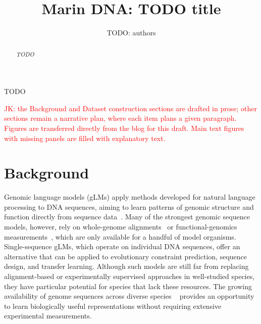 \documentclass[a4paper,num-refs]{oup-contemporary}
\title{Marin DNA: TODO title}
\author[1]{TODO: authors}
\affil[1]{TODO: affiliations}
\newcommand{\todo}{\par\noindent\textit{TODO}\par}
\begin{document}
\begin{frontmatter}
\maketitle
\begin{abstract}
\todo
\end{abstract}
\begin{keywords}
TODO
\end{keywords}
\end{frontmatter}

\textcolor{red}{JK: the Background and Dataset construction sections are drafted in prose;
other sections remain a narrative plan, where each item plans a given paragraph.
Figures are transferred directly from the blog for this draft.
Main text figures with missing panels are filled with explanatory text.}


\section{Background}

Genomic language models (gLMs) apply methods developed for natural language
processing to DNA sequences, aiming to learn patterns of genomic structure and
function directly from sequence data~\citep{benegas2025review}.
Many of the strongest genomic sequence models, however, rely on
whole-genome alignments~\citep{ye2025gpnstar} or functional-genomics
measurements~\citep{avsec2026alphagenome}, which are only available
for a handful of model organisms.
Single-sequence gLMs, which operate on individual DNA
sequences, offer an alternative that can be applied to evolutionary constraint
prediction, sequence design, and transfer learning. Although such models are
still far from replacing alignment-based or experimentally supervised approaches
in well-studied species, they have particular potential for species that lack
these resources.
The growing availability of genome sequences across diverse species
~\citep{darwin2022sequence,lewin2022earth} provides an opportunity to learn
biologically useful representations without requiring extensive experimental
measurements.
\end{document}
